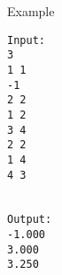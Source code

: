 Example
\begin{verbatim}
Input:
3
1 1
-1
2 2
1 2
3 4
2 2
1 4
4 3


Output:
-1.000
3.000
3.250
\end{verbatim}